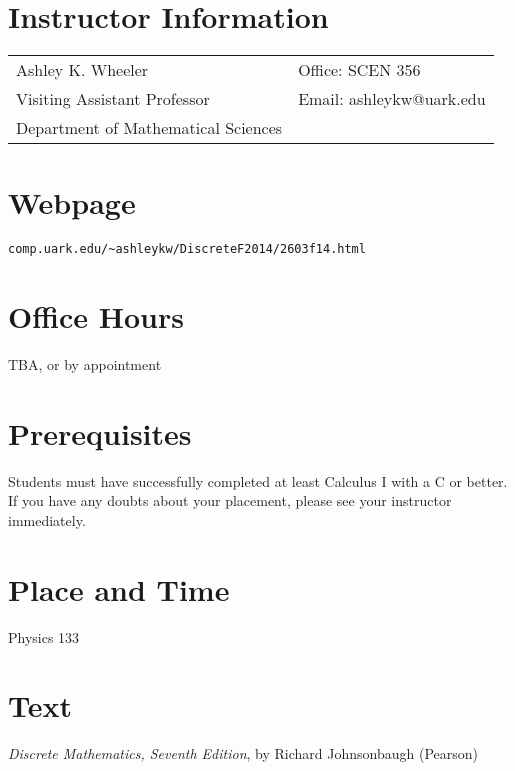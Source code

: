 \documentclass[margin,line,pifont,palatino,courier]{res}
\begin{document}

\begin{resume}

\section{\sc Instructor Information}

\vspace{.05in}
\begin{tabular}{@{}p{2.75in}p{2in}}
Ashley K. Wheeler & Office: SCEN 356 \\
Visiting Assistant Professor & Email: ashleykw@uark.edu \\
Department of Mathematical Sciences & 
\end{tabular}

\section{\sc Webpage}
\verb+comp.uark.edu/~ashleykw/DiscreteF2014/2603f14.html+

\section{\sc Office Hours}
TBA, or by appointment

\section{\sc Prerequisites}
Students must have successfully completed at least Calculus I with a C or better.  If you have any doubts about your placement, please see your instructor immediately.

\section{\sc Place and Time} Physics 133

\section{\sc Text} \emph{Discrete Mathematics, Seventh Edition}, by Richard Johnsonbaugh  (Pearson) 

\vspace{-0.25pc}

\end{resume}
\end{document}

